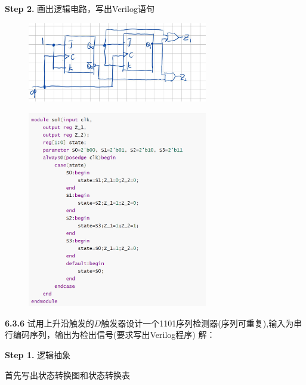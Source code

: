 \documentclass[a4paper,11pt,UTF8]{article}
\begin{document}
\textbf{Step 2.} 画出逻辑电路，写出Verilog语句
\begin{figure}[H]
	\centering
	\includegraphics[width=0.7\textwidth]{6.3.5_1}
\end{figure}
\begin{figure}[H]
	\centering
	\includegraphics[width=0.7\textwidth]{6.3.5_2}
\end{figure}
\textbf{6.3.6} 试用上升沿触发的$D$触发器设计一个1101序列检测器(序列可重复),输入为串行编码序列，输出为检出信号(要求写出Verilog程序)
\noindent 解：

\textbf{Step 1.} 逻辑抽象

首先写出状态转换图和状态转换表
\end{document}
